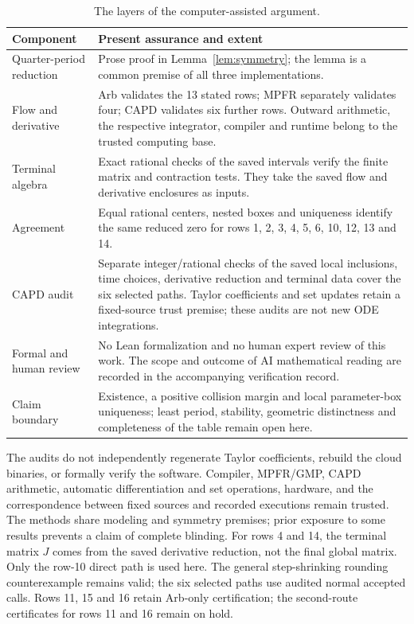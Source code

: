 \documentclass[10pt,a4paper]{article}
\theoremstyle{remark}
\begin{document}
\begin{table}[htbp]
\centering\small
\begin{tabular}{@{}p{.25\linewidth}p{.69\linewidth}@{}}
\toprule
Component & Present assurance and extent\\
\midrule
Quarter-period reduction & Prose proof in Lemma~\ref{lem:symmetry}; the
lemma is a common premise of all three implementations.\\
Flow and derivative & Arb validates the 13 stated rows; MPFR separately
validates four; CAPD validates six further rows. Outward arithmetic,
the respective integrator, compiler and runtime belong to the trusted
computing base.\\
Terminal algebra & Exact rational checks of the saved intervals verify
the finite matrix and contraction tests. They take the saved flow and
derivative enclosures as inputs.\\
Agreement & Equal rational centers, nested boxes and uniqueness identify
the same reduced zero for rows 1, 2, 3, 4, 5, 6, 10, 12, 13 and 14.\\
CAPD audit & Separate integer/rational checks of the saved local
inclusions, time choices, derivative reduction and terminal data cover
the six selected paths. Taylor coefficients and set updates retain a
fixed-source trust premise; these audits are not new ODE integrations.\\
Formal and human review & No Lean formalization and no human expert
review of this work. The scope and outcome of AI mathematical reading
are recorded in the accompanying verification record.\\
Claim boundary & Existence, a positive collision margin and local
parameter-box uniqueness; least period, stability, geometric
distinctness and completeness of the table remain open here.\\
\bottomrule
\end{tabular}
\caption{The layers of the computer-assisted argument.}
\label{tab:assurance}
\end{table}

The audits do not independently regenerate Taylor coefficients, rebuild
the cloud binaries, or formally verify the software. Compiler,
MPFR/GMP, CAPD arithmetic, automatic differentiation and set operations,
hardware, and the correspondence between fixed sources and recorded
executions remain trusted. The methods share modeling and symmetry
premises; prior exposure to some results prevents a claim of complete
blinding. For rows 4 and 14, the terminal matrix $J$ comes from the
saved derivative reduction, not the final global matrix. Only the
row-10 direct path is used here. The general step-shrinking rounding
counterexample remains valid; the six selected paths use audited normal
accepted calls. Rows 11, 15 and 16 retain Arb-only certification;
the second-route certificates for rows 11 and 16 remain on hold.
\end{document}
